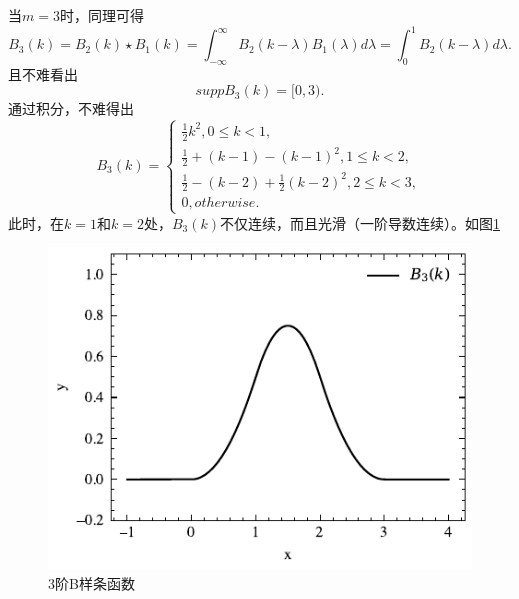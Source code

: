 当$m=3$时，同理可得
\begin{equation*}
    B_{3}(k)=B_{2}(k)\star B_{1}(k)=\int_{-\infty}^{\infty}B_{2}(k-\lambda)B_{1}(\lambda)d\lambda=
\int_{0}^{1}B_{2}(k-\lambda)d\lambda .
\end{equation*}
且不难看出
\begin{equation}
    supp B_3(k)=[0,3).
\end{equation}
通过积分，不难得出
\begin{equation}
B_3(k)=
    \left\{\begin{matrix} 
\frac{1}{2}k^2 ,0\le k<1,\\
\frac{1}{2}+(k-1)-(k-1)^2 ,1\le k<2,\\
\frac{1}{2}-(k-2)+\frac{1}{2} (k-2)^2 ,2\le k<3,\\
0,otherwise.
\end{matrix}\right. 
\end{equation}
此时，在$k=1$和$k=2$处，$B_3(k)$不仅连续，而且光滑（一阶导数连续）。如图\ref{B3}
\begin{figure}[htbp]
    \centering
    \includegraphics[width=0.76\linewidth]{figures/B-splin/B3.pdf}
    \caption{3阶B样条函数}
    \label{B3}
\end{figure}

